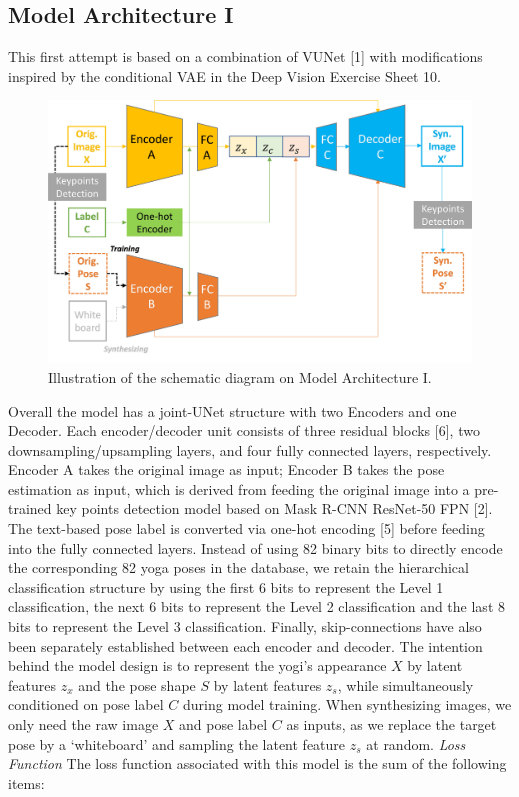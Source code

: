 \documentclass{article}
\begin{document}
\subsection{Model Architecture I}
This first attempt is based on a combination of VUNet [1] with modifications inspired by the conditional VAE in the Deep Vision Exercise Sheet 10.
\newline

\begin{figure}[H]
    \centering
    \includegraphics[scale=0.11]{fig2.jpg}
    \caption{Illustration of the schematic diagram on Model Architecture I.}
    \label{fig:arch1}
\end{figure}
\noindent
Overall the model has a joint-UNet structure with two Encoders and one Decoder. Each encoder/decoder unit consists of three residual blocks [6], two downsampling/upsampling layers, and four fully connected layers, respectively. Encoder A takes the original image as input; Encoder B takes the pose estimation as input, which is derived from feeding the original image into a pre-trained key points detection model based on Mask R-CNN ResNet-50 FPN [2]. The text-based pose label is converted via one-hot encoding [5] before feeding into the fully connected layers. Instead of using 82 binary bits to directly encode the corresponding 82 yoga poses in the database, we retain the hierarchical classification structure by using the first 6 bits to represent the Level 1 classification, the next 6 bits to represent the Level 2 classification and the last 8 bits to represent the Level 3 classification. Finally, skip-connections have also been separately established between each encoder and decoder.
\newline
\newline
The intention behind the model design is to represent the yogi’s appearance ${X}$ by latent features ${z_x}$ and the pose shape ${S}$ by latent features ${z_s}$, while simultaneously conditioned on pose label ${C}$ during model training. When synthesizing images, we only need the raw image ${X}$ and pose label ${C}$ as inputs, as we replace the target pose by a ‘whiteboard’ and sampling the latent feature ${z_s}$ at random.
\newline
\newline
\textit{Loss Function}
\newline
\newline
The loss function associated with this model is the sum of the following items:
\end{document}
